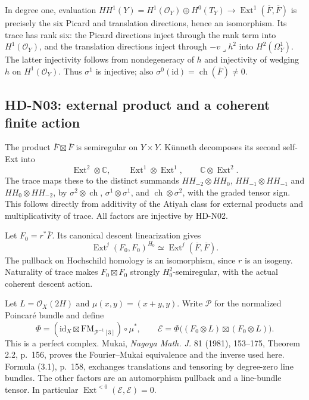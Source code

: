 In degree one, evaluation
$HH^1(Y)=H^1(\mathcal O_Y)\oplus H^0(T_Y)\to
\operatorname{Ext}^1(\overline F,\overline F)$ is precisely the six
Picard and translation directions, hence an isomorphism. Its trace has
rank six: the Picard directions inject through the rank term into
$H^1(\mathcal O_Y)$, and the translation directions inject through
$-v\mathbin{\lrcorner}h^2$ into $H^2(\Omega_Y^1)$.
The latter injectivity follows from nondegeneracy of $h$ and injectivity
of wedging $h$ on $H^1(\mathcal O_Y)$. Thus $\sigma^1$ is injective;
also $\sigma^0(\mathrm{id})=\operatorname{ch}(\overline F)\ne0$.

\subsection{HD-N03: external product and a coherent finite action}
\label{hd-n03}

The product $\overline F\boxtimes\overline F$ is semiregular on
$Y\times Y$. K\"unneth decomposes its second self-Ext into
\[
 \operatorname{Ext}^2\otimes\mathbb C,
 \qquad\operatorname{Ext}^1\otimes\operatorname{Ext}^1,
 \qquad\mathbb C\otimes\operatorname{Ext}^2.
\]
The trace maps these to the distinct summands
$HH_{-2}\otimes HH_0$, $HH_{-1}\otimes HH_{-1}$ and
$HH_0\otimes HH_{-2}$, by
$\sigma^2\otimes\operatorname{ch}$,
$\sigma^1\otimes\sigma^1$, and
$\operatorname{ch}\otimes\sigma^2$, with the graded tensor sign.
This follows directly from additivity of the Atiyah class for external
products and multiplicativity of trace. All factors are injective by
HD-N02.

Let $F_0=r^*\overline F$. Its canonical descent linearization gives
\[
 \operatorname{Ext}^j(F_0,F_0)^{H_0}
 \simeq\operatorname{Ext}^j(\overline F,\overline F).
\]
The pullback on Hochschild homology is an isomorphism, since $r$ is an
isogeny. Naturality of trace makes $F_0\boxtimes F_0$ strongly
$H_0^2$-semiregular, with the actual coherent descent action.

Let $L=\mathcal O_X(2H)$ and $\mu(x,y)=(x+y,y)$. Write $\mathcal P$
for the normalized Poincar\'e bundle and define
\begin{equation}\label{hd-n-perfect-complex}
 \Phi=(\mathrm{id}_X\boxtimes\mathrm{FM}_{\mathcal P^{-1}[3]})
        \circ\mu^*,\qquad
 \mathcal E=\Phi\bigl((F_0\otimes L)\boxtimes(F_0\otimes L)\bigr).
\end{equation}
This is a perfect complex. Mukai, \emph{Nagoya Math. J.} 81 (1981),
153--175, Theorem 2.2, p.~156, proves the Fourier--Mukai equivalence and
the inverse used here. Formula (3.1), p.~158, exchanges translations and
tensoring by degree-zero line bundles. The other factors are an
automorphism pullback and a line-bundle tensor. In particular
$\operatorname{Ext}^{<0}(\mathcal E,\mathcal E)=0$.

